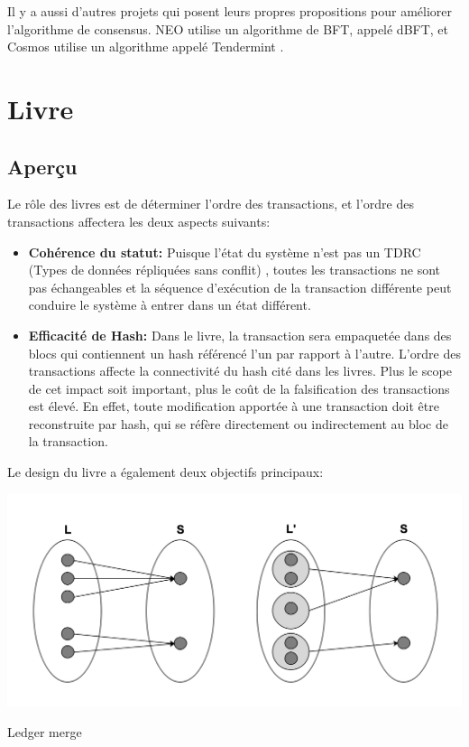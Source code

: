 \documentclass[UTF8,nofonts]{article}
\makeatletter
\newenvironment{figurehere}
 {\def\@captype{figure}}
 {}
\makeatother
\begin{document}
\begin{multicols}{2}
Il y a aussi d'autres projets qui posent leurs propres propositions pour améliorer l'algorithme de consensus. NEO\cite{neo} utilise un algorithme de BFT, appelé dBFT, et Cosmos\cite{cosmos} utilise un algorithme appelé Tendermint  \cite{tendermint}.

\section{Livre}
\subsection{Aperçu}
Le rôle des livres est de déterminer l'ordre des transactions, et l'ordre des transactions affectera les deux aspects suivants:
\begin{itemize}
	\item \textbf{Cohérence du statut:} Puisque l'état du système n'est pas un TDRC (Types de données répliquées sans conflit) \cite{tdrc}, toutes les transactions ne sont pas échangeables et la séquence d'exécution de la transaction différente peut conduire le système à entrer dans un état différent.
	\item \textbf{Efficacité de Hash:} Dans le livre, la transaction sera empaquetée dans des blocs qui contiennent un hash référencé l'un par rapport à l'autre. L'ordre des transactions affecte la connectivité du hash cité dans les livres. Plus le scope de cet impact soit important, plus le coût de la falsification des transactions est élevé. En effet, toute modification apportée à une transaction doit être reconstruite par hash, qui se réfère directement ou indirectement au bloc de la transaction.
\end{itemize}

Le design du livre a également deux objectifs principaux:

\begin{center}
\begin{figurehere}
\includegraphics[width=.7\linewidth]{image/ledger-merge.png}
\caption{Ledger merge}
\end{figurehere}
\end{center}


\end{multicols}
\end{document}
